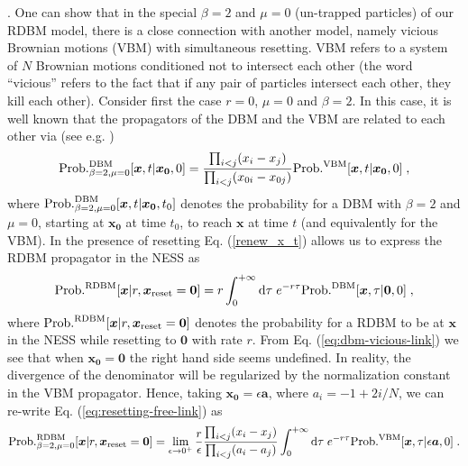 \documentclass[onecolumn,superscriptaddress,
 amsmath,amssymb,
 aps,
 prd,
]{revtex4-1}
\begin{document}
{  
   
   
\vspace*{0.3cm}   
. One can show that in the special $\beta =2$ and $\mu=0$ (un-trapped particles) of our RDBM model, there is a close connection with another model, namely vicious Brownian motions (VBM) with simultaneous resetting. VBM refers to a system of $N$ Brownian motions conditioned not to intersect each other (the word ``vicious'' refers to the fact that if any pair of particles intersect each other, they kill each other). Consider first the case $r=0$, $\mu = 0$ and $\beta = 2$. In this case, it is well known that the propagators of the DBM and the VBM are related to each other via  
(see e.g. \cite{GMS21,RS11})
\begin{equation} \label{eq:dbm-vicious-link}
{\rm Prob.}^{\rm DBM}_{\beta = 2, \mu=0}[\bm{x}, t | \bm{x_0}, 0] = \frac{\prod_{i < j} (x_i - x_j) }{\prod_{i < j} (x_{0i} - x_{0j}) } {\rm Prob.}^{\rm VBM}[\bm{x}, t | \bm{x_0}, 0] \;,
\end{equation}
{where ${\rm Prob.}_{\beta = 2, \mu=0}^{\rm DBM}[\bm{x}, t | \bm{x_0}, t_0]$ denotes the probability for a DBM with $\beta = 2$ and $\mu=0$, 
starting at $\bm{x_0}$ at time $t_0$, to reach $\bm{x}$ at time $t$ (and equivalently for the VBM).}
In the presence of resetting Eq. (\ref{renew_x_t}) allows us to express the RDBM propagator in the NESS as 
\begin{equation} \label{eq:resetting-free-link}
{\rm Prob.}^{\rm RDBM}[\bm{x} | r, \bm{x}_{\rm reset} = \bm{0}] = r \int_0^{+\infty} \dd \tau \; e^{-r \tau} {\rm Prob.}^{\rm DBM}[\bm{x}, \tau | \bm{0}, 0] \;,
\end{equation}
{where ${\rm Prob.}^{\rm RDBM}[\bm{x} | r, \bm{x}_{\rm reset} = \bm{0}] $ denotes the probability for a RDBM to be at $\bm{x}$ in the NESS while resetting to $\bm{0}$ with rate $r$.}
From Eq. (\ref{eq:dbm-vicious-link}) we see that when $\bm{x_0} = \bm{0}$ the right hand side seems undefined. In reality, the divergence of the denominator will be regularized by the normalization constant in the VBM propagator. Hence, taking $\bm{x_0} = \epsilon \bm{a}$, where $a_{i} = -1 + 2 i /N$, we can re-write Eq. (\ref{eq:resetting-free-link}) as
\begin{equation} \label{eq:RDBM-VBM-renewal}
{\rm Prob.}^{\rm RDBM}_{\beta = 2, \mu=0}[\bm{x} | r, \bm{x}_{\rm reset} = \bm{0}] = \lim_{\epsilon \to 0^+} \frac{r}{\epsilon} \frac{\prod_{i < j} (x_i - x_j)}{ \prod_{i < j} (a_i - a_j) } \int_0^{+\infty} \dd \tau \; e^{-r \tau} {\rm Prob.}^{\rm VBM}[\bm{x}, \tau | \epsilon \bm{a}, 0] \;.

\end{equation}}
\end{document}
